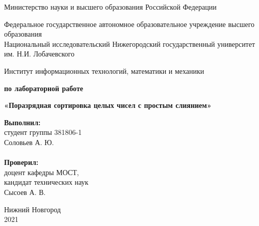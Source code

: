 \documentclass{report}
\begin{document}
\begin{titlepage}

\begin{center}
Министерство науки и высшего образования Российской Федерации
\end{center}

\begin{center}
Федеральное государственное автономное образовательное учреждение высшего образования \\
Национальный исследовательский Нижегородский государственный университет им. Н.И. Лобачевского
\end{center}

\begin{center}
Институт информационных технологий, математики и механики
\end{center}

\vspace{4em}

\begin{center}
\textbf{ по лабораторной работе} \\
\end{center}
\begin{center}
\textbf{\Large«Поразрядная сортировка целых чисел с простым слиянием»} \\
\end{center}

\vspace{4em}

\newbox{\lbox}
\newlength{\maxl}
\setlength{\maxl}{\wd\lbox}
\hfill\parbox{7cm}{
\hspace*{5cm}\hspace*{-5cm}\textbf{Выполнил:} \\ студент группы 381806-1 \\ Соловьев А. Ю.\\
\\
\hspace*{5cm}\hspace*{-5cm}\textbf{Проверил:}\\ доцент кафедры МОСТ, \\ кандидат технических наук \\ Сысоев А. В.\\
}
\vspace{\fill}

\begin{center} Нижний Новгород \\ 2021 \end{center}

\end{titlepage}
\end{document}
